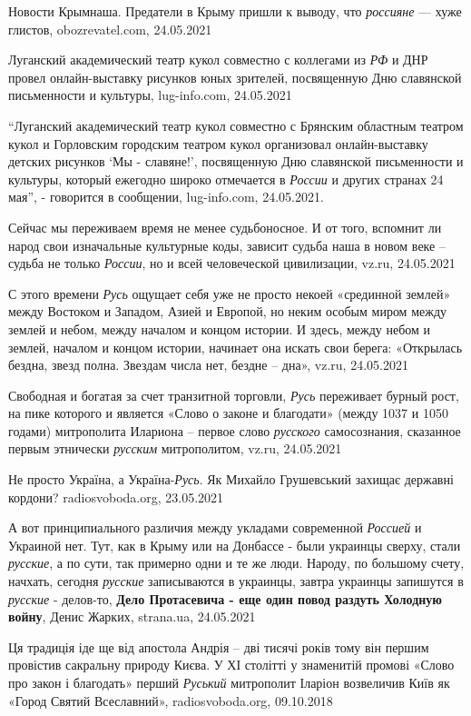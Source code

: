 Новости Крымнаша. Предатели в Крыму пришли к выводу, что \emph{россияне} — хуже
глистов, obozrevatel.com, 24.05.2021

Луганский академический театр кукол совместно с коллегами из \emph{РФ} и ДНР
провел онлайн-выставку рисунков юных зрителей, посвященную Дню славянской
письменности и культуры, lug-info.com, 24.05.2021

\enquote{Луганский академический театр кукол совместно с Брянским областным
театром кукол и Горловским городским театром кукол организовал онлайн-выставку
детских рисунков \enquote{Мы - славяне!}, посвященную Дню славянской
письменности и культуры, который ежегодно широко отмечается в \emph{России} и
других странах 24 мая}, - говорится в сообщении, lug-info.com, 24.05.2021.

Сейчас мы переживаем время не менее судьбоносное. И от того, вспомнит ли народ
свои изначальные культурные коды, зависит судьба наша в новом веке – судьба не
только \emph{России}, но и всей человеческой цивилизации, vz.ru, 24.05.2021

С этого времени \emph{Русь} ощущает себя уже не просто некоей «срединной
землей» между Востоком и Западом, Азией и Европой, но неким особым миром между
землей и небом, между началом и концом истории. И здесь, между небом и землей,
началом и концом истории, начинает она искать свои берега: «Открылась бездна,
звезд полна. Звездам числа нет, бездне – дна», vz.ru, 24.05.2021

Свободная и богатая за счет транзитной торговли, \emph{Русь} переживает бурный
рост, на пике которого и является «Слово о законе и благодати» (между 1037 и
1050 годами) митрополита Илариона – первое слово \emph{русского} самосознания,
сказанное первым этнически \emph{русским} митрополитом, vz.ru, 24.05.2021

Не просто Україна, а Україна-\emph{Русь}. Як Михайло Грушевський захищає
державні кордони?  radiosvoboda.org, 23.05.2021

А вот принципиального различия между укладами современной \emph{Россией} и
Украиной нет. Тут, как в Крыму или на Донбассе - были украинцы сверху, стали
\emph{русские}, а по сути, так примерно одни и те же люди. Народу, по большому
счету, начхать, сегодня \emph{русские} записываются в украинцы, завтра украинцы
запишутся в \emph{русские} - делов-то, \textbf{Дело Протасевича - еще один
повод раздуть Холодную войну}, Денис Жарких, strana.ua, 24.05.2021

Ця традиція іде ще від апостола Андрія – дві тисячі років тому він першим
провістив сакральну природу Києва. У ХІ столітті у знаменитій промові «Слово
про закон і благодать» перший \emph{Руський} митрополит Іларіон возвеличив Київ
як «Город Святий Всеславний», radiosvoboda.org, 09.10.2018

